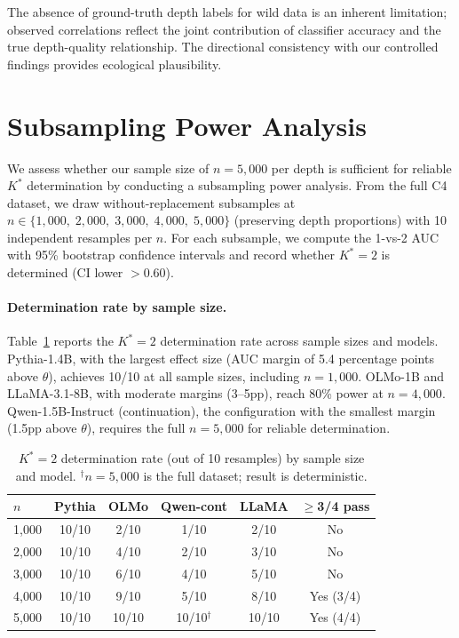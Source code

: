 \documentclass[11pt,a4paper]{article}
\newcommand{\Kstar}{K^{*}}
\begin{document}
The absence of ground-truth depth labels for wild data is an inherent limitation; observed correlations reflect the joint contribution of classifier accuracy and the true depth-quality relationship. The directional consistency with our controlled findings provides ecological plausibility.

\section{Subsampling Power Analysis}
\label{app:power}

We assess whether our sample size of $n = 5{,}000$ per depth is sufficient for reliable $\Kstar$ determination by conducting a subsampling power analysis. From the full C4 dataset, we draw without-replacement subsamples at $n \in \{1{,}000,\; 2{,}000,\; 3{,}000,\; 4{,}000,\; 5{,}000\}$ (preserving depth proportions) with 10 independent resamples per $n$. For each subsample, we compute the 1-vs-2 AUC with 95\% bootstrap confidence intervals and record whether $\Kstar = 2$ is determined (CI lower $> 0.60$).

\paragraph{Determination rate by sample size.} Table~\ref{tab:power-rate} reports the $\Kstar = 2$ determination rate across sample sizes and models. Pythia-1.4B, with the largest effect size (AUC margin of 5.4 percentage points above $\theta$), achieves 10/10 at all sample sizes, including $n = 1{,}000$. OLMo-1B and LLaMA-3.1-8B, with moderate margins (3--5pp), reach 80\% power at $n = 4{,}000$. Qwen-1.5B-Instruct (continuation), the configuration with the smallest margin (1.5pp above $\theta$), requires the full $n = 5{,}000$ for reliable determination.

\begin{table}[t]
\centering
\small
\begin{tabular}{lccccc}
\toprule
$n$ & \textbf{Pythia} & \textbf{OLMo} & \textbf{Qwen-cont} & \textbf{LLaMA} & \textbf{$\geq$3/4 pass} \\
\midrule
1,000 & 10/10 & 2/10 & 1/10 & 2/10 & No \\
2,000 & 10/10 & 4/10 & 2/10 & 3/10 & No \\
3,000 & 10/10 & 6/10 & 4/10 & 5/10 & No \\
4,000 & 10/10 & 9/10 & 5/10 & 8/10 & Yes (3/4) \\
5,000 & 10/10 & 10/10 & 10/10$^\dagger$ & 10/10 & Yes (4/4) \\
\bottomrule
\end{tabular}
\caption{$\Kstar = 2$ determination rate (out of 10 resamples) by sample size and model. $^\dagger n = 5{,}000$ is the full dataset; result is deterministic.}
\label{tab:power-rate}
\end{table}
\end{document}
